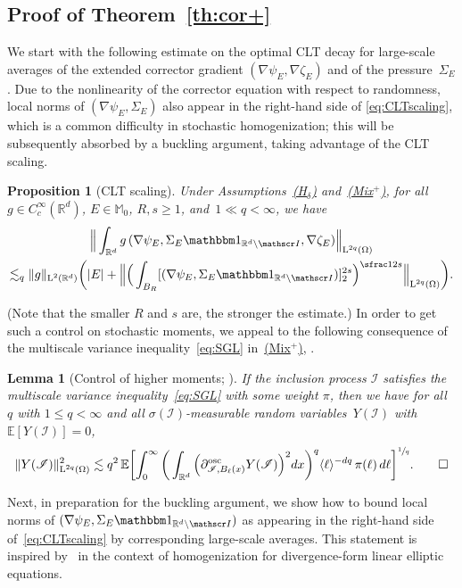 \documentclass[10pt]{amsart}
\let\mathcal\mathscr
\newcommand{\Hd}{\hyperref[Hd]{\textup{(H$_\delta$)}}\xspace}
\newcommand{\Mix}{\hyperref[Mix+]{\textup{(Mix$^+$)}}\xspace}
\let\mathds\mathbbm
\theoremstyle{plain}
\newtheorem{lem}[theor]{Lemma}
\newtheorem{propo}[theor]{Proposition}
\theoremstyle{definition}
\newcommand{\R}{\mathbb R}
\newcommand{\Ic}{\mathcal I}
\newcommand{\Md}{\mathbb M}
\newcommand{\Ld}{\operatorname{L}}
\newcommand{\E}{\mathbb{E}}
\newcommand{\expec}[1]{\mathbb{E}\left[ #1 \right]}
\begin{document}
\subsection{Proof of Theorem~\ref{th:cor+}}\label{sec:fluc-str}
We start with the following estimate on the optimal CLT decay for large-scale averages of the extended corrector gradient $(\nabla\psi_E,\nabla\zeta_E)$ and of the pressure~$\Sigma_E$.
Due to the nonlinearity of the corrector equation with respect to randomness, local norms of $(\nabla\psi_E,\Sigma_E)$ also appear in the right-hand side of \eqref{eq:CLTscaling}, which is a common difficulty in stochastic homogenization; this will be subsequently absorbed by a buckling argument, taking advantage of the CLT scaling.
\begin{propo}[CLT scaling]\label{prop:CLTscaling}
Under Assumptions~\Hd and~\Mix, for all $g\in C^\infty_c(\R^d)$, $E\in\Md_0$, $R,s\ge1$, and~$1\ll q<\infty$, we have
\begin{multline}\label{eq:CLTscaling}
\Big\|\int_{\R^d}g\,(\nabla \psi_E,\Sigma_E\mathds1_{\R^d\setminus\Ic},\nabla\zeta_E)\Big\|_{\Ld^{2q}(\Omega)}\\
\lesssim_q \|g\|_{\Ld^2(\R^d)}\bigg(|E|+\Big\|\Big(\int_{B_{R}}[(\nabla\psi_E,\Sigma_E\mathds1_{\R^d\setminus\Ic})]_2^{2s}\Big)^{\sfrac1{2s}}\Big\|_{\Ld^{2q}(\Omega)}\bigg).
\end{multline}
\end{propo}
(Note that the smaller $R$ and $s$ are, the stronger the estimate.)
In order to get such a control on stochastic moments, we appeal to the following consequence of the multiscale variance inequality~\eqref{eq:SGL} in~\Mix, \cf \cite[Prop.\,1.10(ii)]{DG1}.

\begin{lem}[Control of higher moments; \cite{DG1}]\label{lem:p}
If the inclusion process $\Ic$ satisfies the multiscale variance inequality~\eqref{eq:SGL} with some weight $\pi$, then we have for all $q$ with $1\le q<\infty$ and all $\sigma(\Ic)$-measurable random variables~$Y(\Ic)$
with \hbox{$\expec{Y(\Ic)}=0$},
\begin{equation}\label{eq:SGL-p}
\|Y(\Ic)\|_{\Ld^{2q}(\Omega)}^2\lesssim q^2\,\E\bigg[{\int_0^\infty \bigg(\int_{\R^d}\Big(\partial^{\operatorname{osc}}_{\Ic,B_\ell(x)}Y(\Ic)\Big)^2dx\bigg)^q \langle\ell\rangle^{-dq}\,\pi(\ell)\,d\ell}\bigg]^{\sfrac1q}.
\qedhere
\end{equation}
\end{lem}

Next, in preparation for the buckling argument, we show how to bound local norms of $(\nabla\psi_E,\Sigma_E\mathds1_{\R^d\setminus\Ic})$ as appearing in the right-hand side of~\eqref{eq:CLTscaling} by corresponding large-scale averages.
This statement is inspired by~\cite{JO} in the context of homogenization for divergence-form linear elliptic equations.
\end{document}
